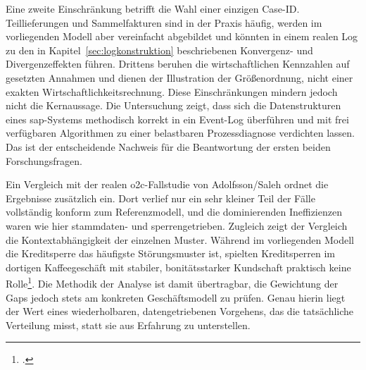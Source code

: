 Eine zweite Einschränkung betrifft die Wahl einer einzigen Case-ID. Teillieferungen und Sammelfakturen sind in der Praxis häufig, werden im vorliegenden Modell aber vereinfacht abgebildet und könnten in einem realen Log zu den in Kapitel~\ref{sec:logkonstruktion} beschriebenen Konvergenz- und Divergenzeffekten führen. Drittens beruhen die wirtschaftlichen Kennzahlen auf gesetzten Annahmen und dienen der Illustration der Größenordnung, nicht einer exakten Wirtschaftlichkeitsrechnung. Diese Einschränkungen mindern jedoch nicht die Kernaussage. Die Untersuchung zeigt, dass sich die Datenstrukturen eines \gls{sap}-Systems methodisch korrekt in ein Event-Log überführen und mit frei verfügbaren Algorithmen zu einer belastbaren Prozessdiagnose verdichten lassen. Das ist der entscheidende Nachweis für die Beantwortung der ersten beiden Forschungsfragen.

Ein Vergleich mit der realen \gls{o2c}-Fallstudie von Adolfsson/Saleh ordnet die Ergebnisse zusätzlich ein. Dort verlief nur ein sehr kleiner Teil der Fälle vollständig konform zum Referenzmodell, und die dominierenden Ineffizienzen waren wie hier stammdaten- und sperrengetrieben. Zugleich zeigt der Vergleich die Kontextabhängigkeit der einzelnen Muster. Während im vorliegenden Modell die Kreditsperre das häufigste Störungsmuster ist, spielten Kreditsperren im dortigen Kaffeegeschäft mit stabiler, bonitätsstarker Kundschaft praktisch keine Rolle\footcite[Vgl.][S.~51]{adolfsson2026o2c}. Die Methodik der Analyse ist damit übertragbar, die Gewichtung der Gaps jedoch stets am konkreten Geschäftsmodell zu prüfen. Genau hierin liegt der Wert eines wiederholbaren, datengetriebenen Vorgehens, das die tatsächliche Verteilung misst, statt sie aus Erfahrung zu unterstellen.
